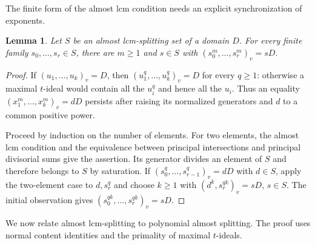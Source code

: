 \documentclass[11pt]{amsart}
\newtheorem{lemma}[theorem]{Lemma}
\theoremstyle{definition}
\theoremstyle{remark}
\begin{document}
The finite form of the almost lcm condition needs an explicit
synchronization of exponents.

\begin{lemma}\label{l:finite-lcm-form}
Let $S$ be an almost lcm-splitting set of a domain $D$.
For every finite family $s_0,\ldots,s_r\in S$, there are
$m\geq1$ and $s\in S$ with $(s_0^m,\ldots,s_r^m)_v=sD$.
\end{lemma}
\begin{proof}
If $(u_1,\ldots,u_k)_v=D$, then
$(u_1^q,\ldots,u_k^q)_v=D$ for every $q\geq1$:
otherwise a maximal $t$-ideal would contain all the $u_i^q$
and hence all the $u_i$. Thus an equality
$(x_1^m,\ldots,x_k^m)_v=dD$ persists after raising its
normalized generators and $d$ to a common positive power.

Proceed by induction on the number of elements. For two
elements, the almost lcm condition and the equivalence between
principal intersections and principal divisorial sums give
the assertion. Its generator divides an element of $S$ and
therefore belongs to $S$ by saturation. If
$(s_0^q,\ldots,s_{r-1}^q)_v=dD$ with $d\in S$, apply the
two-element case to $d,s_r^q$ and choose $k\geq1$ with
$(d^k,s_r^{qk})_v=sD$, $s\in S$.
The initial observation gives
$(s_0^{qk},\ldots,s_r^{qk})_v=sD$.
\end{proof}

We now relate almost lcm-splitting to polynomial almost splitting.
The proof uses normal content identities and the primality of
maximal $t$-ideals.
\end{document}
